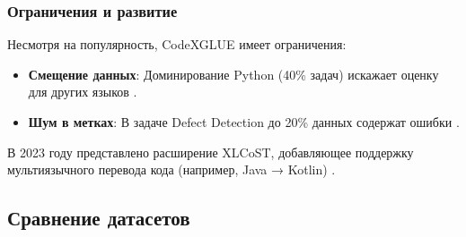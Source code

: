 \documentclass[14pt]{article}
\theoremstyle{definition}
\begin{document}
\subsubsection{Ограничения и развитие}
Несмотря на популярность, CodeXGLUE имеет ограничения:
\begin{itemize}
    \item \textbf{Смещение данных}: Доминирование Python (40\% задач) искажает оценку для других языков \cite{karampatsis2020big}.
    \item \textbf{Шум в метках}: В задаче Defect Detection до 20\% данных содержат ошибки \cite{chen2023}.
\end{itemize}

В 2023 году представлено расширение XLCoST, добавляющее поддержку мультиязычного перевода кода (например, Java → Kotlin) \cite{zhu2022}.

\newpage

\subsection{Сравнение датасетов}
\end{document}
